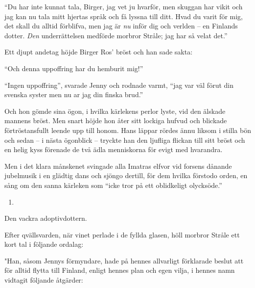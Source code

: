 ``Du har inte kunnat tala, Birger, jag vet ju hvarför, men skuggan har
vikit och jag kan nu tala mitt hjertas språk och få lyssna till ditt.
Hvad du varit för mig, det skall du alltid förblifva, men jag är
\emph{nu} inför dig och verlden -- en Finlands dotter. \emph{Den}
underrättelsen medförde morbror Stråle; jag har så velat det.''

Ett djupt andetag höjde Birger Ros' bröst och han sade sakta:

``Och denna uppoffring har du hemburit mig!''

``Ingen uppoffring'', svarade Jenny och rodnade varmt, ``jag var väl
förut din svenska syster men nu ar jag din finska brud.''

Och hon gömde sina ögon, i hvilka kärlekens perlor lyste, vid den
älskade mannens bröst. Men snart höjde hon åter sitt lockiga hufvud och
blickade förtröstansfullt leende upp till honom. Hans läppar rördes ännu
liksom i stilla bön och sedan -- i nästa ögonblick -- tryckte han den
ljufliga flickan till sitt bröst och en helig kyss förenade de två ädla
menniskorna för evigt med hvarandra.

Men i det klara månskenet svingade alla Imatras elfvor vid forsens
dånande jubelmusik i en glädtig dans och sjöngo dertill, för dem hvilka
förstodo orden, en sång om den sanna kärleken som ``icke tror på ett
oblidkeligt olycksöde.''

\begin{enumerate}
\def\labelenumi{\arabic{enumi}.}
\setcounter{enumi}{26}
\tightlist
\item
\end{enumerate}

Den vackra adoptivdottern.

Efter qvällsvarden, när vinet perlade i de fyllda glasen, höll morbror
Stråle ett kort tal i följande ordalag:

"Han, såsom Jennys förmyndare, hade på hennes allvarligt förklarade
beslut att för alltid flytta till Finland, enligt hennes plan och egen
vilja, i hennes namn vidtagit följande åtgärder:

